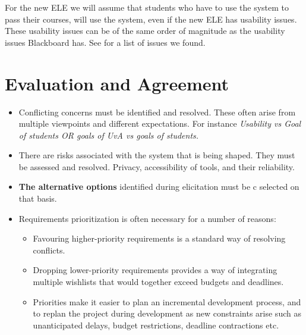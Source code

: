 \begin{itemize}
	For the new ELE we will assume that students who have to use the system to pass their courses, will use the system, even if the new ELE has usability issues. These usability issues can be of the same order of magnitude as the usability issues Blackboard has. See  for a list of issues we found. 
	

\end{itemize}

\chapter{Evaluation and Agreement}
\begin{itemize}
	\item Conflicting concerns must be identified and resolved. These often arise from multiple
	viewpoints and different expectations. For instance \textit{Usability vs Goal of students OR goals of UvA vs goals of students.}
	\item There are risks associated with the system that is being shaped. They must be assessed
	and resolved. {Privacy, accessibility of tools, and their reliability.}
	\item \textbf{The alternative options} identified during elicitation must be c
                                                                                selected on that basis. 
	\item Requirements prioritization is often necessary for a number of reasons: \begin{itemize}
		\item Favouring higher-priority requirements is a standard way of resolving conflicts.
		\item Dropping lower-priority requirements provides a way of integrating multiple wishlists
		that would together exceed budgets and deadlines.
		\item Priorities make it easier to plan an incremental development process, and to replan
		the project during development as new constraints arise such as unanticipated delays,
		budget restrictions, deadline contractions etc.
	\end{itemize}

\end{itemize}

